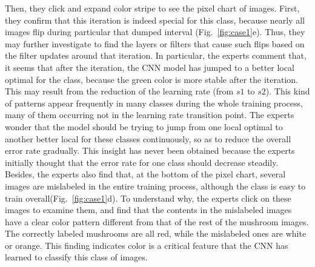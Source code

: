 \documentclass[format=acmsmall, review=false, screen=true]{acmart}
\newcommand{\dy}{\textcolor[rgb]{0,0,0}}
\begin{document}
Then, they click and expand color stripe to see the pixel chart of images.
First, they confirm that this iteration is indeed special for this class, because nearly all images flip during particular that \dy{dumped interval} (Fig.~\ref{fig:case1}e).
Thus, they may further investigate to find the layers or filters that cause such flips based on the filter updates around that iteration.
\dy{In particular, the experts comment that, it seems that after the iteration, the CNN model has jumped to a better local optimal for the class, because the green color is more stable after the iteration.
This may result from the reduction of the learning rate (from $s1$ to $s2$).  
This kind of patterns appear frequently in many classes during the whole training process, many of them occurring not in the learning rate transition point.
The experts wonder that the model should be trying to jump from one local optimal to another better local for these classes continuously, so as to reduce the overall error rate gradually.}
This insight has never been obtained because the experts initially thought that the error rate for one class should decrease steadily.
Besides, the experts also find that, at the bottom of the pixel chart, several images are mislabeled in the entire training process, although the class is easy to train overall(Fig.~\ref{fig:case1}d).
To understand why, the experts click on these images to examine them, and find that the contents in the mislabeled images have a clear color pattern different from that of the rest of the mushroom images.
The correctly labeled mushrooms are all red, while the mislabeled ones are white or orange.
This finding indicates color is a critical feature that the CNN has learned to classify this class of images.
\end{document}
